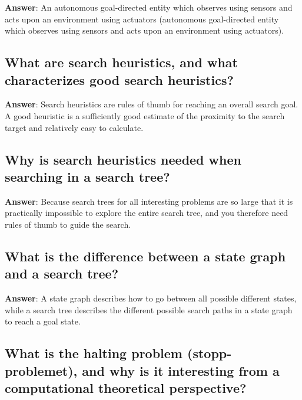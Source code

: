 \documentclass[a4paper,11pt,oneside]{article}
\begin{document}
\begin{sloppypar}
\label{q:327:sa:en:True}

\textbf{Answer}: An autonomous goal-directed entity which observes using sensors and acts upon an environment using actuators (autonomous goal-directed entity which observes using sensors and acts upon an environment using actuators).



\subsection{What are search heuristics, and what characterizes good search heuristics?}

\label{q:328:sa:en:True}

\textbf{Answer}: Search heuristics are rules of thumb for reaching an overall search goal. A good heuristic is a sufficiently good estimate of the proximity to the search target and relatively easy to calculate.



\subsection{Why is search heuristics needed when searching in a search tree?}

\label{q:329:sa:en:True}

\textbf{Answer}: Because search trees for all interesting problems are so large that it is practically impossible to explore the entire search tree, and you therefore need rules of thumb to guide the search.



\subsection{What is the difference between a state graph and a search tree?}

\label{q:330:sa:en:True}

\textbf{Answer}: A state graph describes how to go between all possible different states, while a search tree describes the different possible search paths in a state graph to reach a goal state.



\subsection{What is the halting problem (stopp-problemet), and why is it interesting from a computational theoretical perspective?}


\end{sloppypar}
\end{document}
